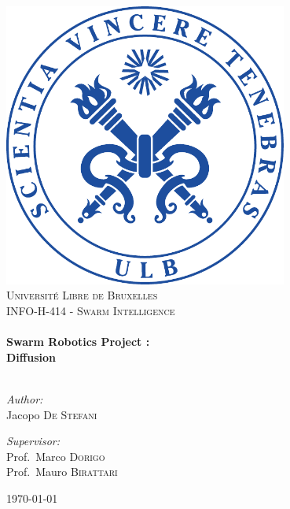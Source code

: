 \begin{titlepage}

\begin{center}


\includegraphics[width=0.70\textwidth]{./Figures/logo-ulb}\\[1cm]    

\textsc{\LARGE Université Libre de Bruxelles}\\[1.5cm]

\textsc{\Large INFO-H-414 - Swarm Intelligence}\\[0.5cm]


\HRule \\[0.4cm]
{ \huge \bfseries Swarm Robotics Project : \\ Diffusion}\\[0.4cm]

\HRule \\[1cm]

\begin{minipage}{0.4\textwidth}
\begin{flushleft} \large
\emph{Author:}\\
Jacopo  \textsc{De Stefani}
\end{flushleft}
\end{minipage}
\begin{minipage}{0.4\textwidth}
\begin{flushright} \large
\emph{Supervisor:} \\
Prof.~Marco \textsc{Dorigo}\\
Prof.~Mauro \textsc{Birattari}
\end{flushright}
\end{minipage}

\vfill

{\large \today}

\end{center}

\end{titlepage}

